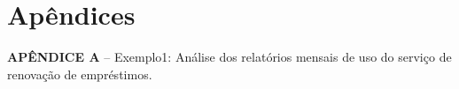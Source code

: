 \chapter*{Apêndices}

\textbf{APÊNDICE A} – Exemplo1: Análise dos relatórios mensais de uso do serviço de
renovação de empréstimos.